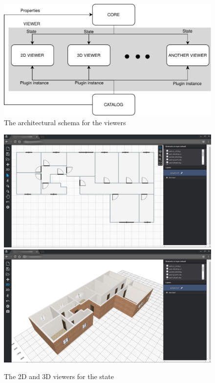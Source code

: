 \begin{figure}[htb]
\centering
\includegraphics[width=\linewidth]{contents/images/diagramma-visualizzatori}

\caption{The architectural schema for the viewers}
\label{fig_viewers}
\end{figure}

\begin{figure}[htb]
\centering
\includegraphics[width=0.45\linewidth]{contents/images/fig-pianta}
\includegraphics[width=0.45\linewidth]{contents/images/fig-pianta-3d}
\caption{The 2D and 3D viewers for the state}
\label{fig_viewer}
\end{figure}


